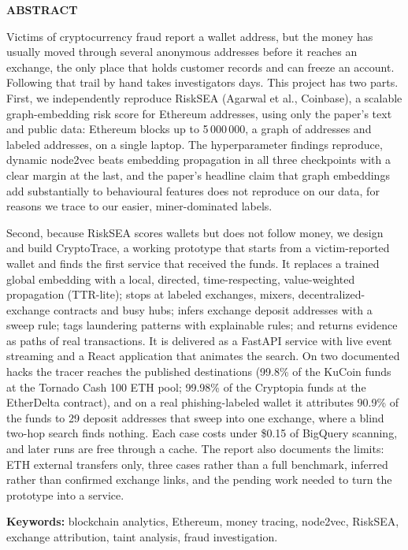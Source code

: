 \begin{center}{\bfseries\fontsize{16}{20}\selectfont ABSTRACT}\end{center}
\vspace{6pt}
\noindent Victims of cryptocurrency fraud report a wallet address, but the money has usually moved through several anonymous addresses before it reaches an exchange, the only place that holds customer records and can freeze an account. Following that trail by hand takes investigators days. This project has two parts. First, we independently reproduce RiskSEA (Agarwal et al., Coinbase), a scalable graph-embedding risk score for Ethereum addresses, using only the paper's text and public data: Ethereum blocks up to 5\,000\,000, a graph of \NumNodes{} addresses and \NumLabeled{} labeled addresses, on a single laptop. The hyperparameter findings reproduce, dynamic node2vec beats embedding propagation in all three checkpoints with a clear margin at the last, and the paper's headline claim that graph embeddings add substantially to behavioural features does not reproduce on our data, for reasons we trace to our easier, miner-dominated labels.

Second, because RiskSEA scores wallets but does not follow money, we design and build CryptoTrace, a working prototype that starts from a victim-reported wallet and finds the first service that received the funds. It replaces a trained global embedding with a local, directed, time-respecting, value-weighted propagation (TTR-lite); stops at labeled exchanges, mixers, decentralized-exchange contracts and busy hubs; infers exchange deposit addresses with a sweep rule; tags laundering patterns with explainable rules; and returns evidence as paths of real transactions. It is delivered as a FastAPI service with live event streaming and a React application that animates the search. On two documented hacks the tracer reaches the published destinations (99.8\% of the KuCoin funds at the Tornado Cash 100 ETH pool; 99.98\% of the Cryptopia funds at the EtherDelta contract), and on a real phishing-labeled wallet it attributes 90.9\% of the funds to 29 deposit addresses that sweep into one exchange, where a blind two-hop search finds nothing. Each case costs under \$0.15 of BigQuery scanning, and later runs are free through a cache. The report also documents the limits: ETH external transfers only, three cases rather than a full benchmark, inferred rather than confirmed exchange links, and the pending work needed to turn the prototype into a service.

\medskip
\noindent\textbf{Keywords:} blockchain analytics, Ethereum, money tracing, node2vec, RiskSEA, exchange attribution, taint analysis, fraud investigation.
\clearpage

\singlespacing
\tableofcontents
\clearpage
\listoftables
\clearpage
\listoffigures
\clearpage
\onehalfspacing
